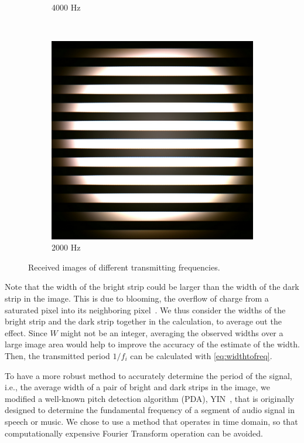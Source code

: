 \begin{figure}[!t]
\begin{subfigure}[h]{0.12\textwidth}
  \caption{4000 Hz}
  \end{subfigure}
  ~ 
  \begin{subfigure}[h]{0.12\textwidth}
  \includegraphics[width=\textwidth]{fig/strip3.png}
  \caption{2000 Hz}
  \end{subfigure}
\caption{Received images of different transmitting frequencies.}
\label{fig:freq_strip}
\end{figure}

Note that the width of the bright strip could be larger than the width of the dark strip in the image. This is due to blooming, the overflow of charge from a saturated pixel into its neighboring pixel~\cite{el2005cmos}. We thus consider the widths of the bright strip and the dark strip together in the calculation, to average out the effect. Since $W$ might not be an integer, averaging the observed widths over a large image area would help to improve the accuracy of the estimate of the width. Then, the transmitted period $1/f_i$ can be calculated with \autoref{eq:widthtofreq}. 

To have a more robust method to accurately determine the period of the signal, i.e., the average width of a pair of bright and dark strips in the image, we modified a well-known pitch detection algorithm (PDA), YIN~\cite{de2002yin}, that is originally designed to determine the fundamental frequency of a segment of audio signal in speech or music. We chose to use a method that operates in time domain, so that computationally expensive Fourier Transform operation can be avoided. 

